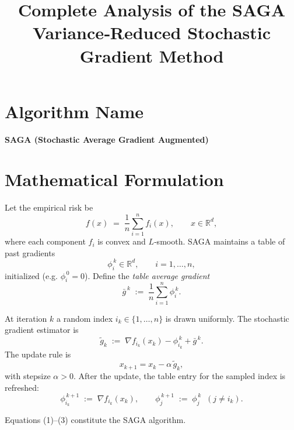 \documentclass[11pt]{article}
\begin{document}
\title{Complete Analysis of the SAGA Variance‑Reduced Stochastic Gradient Method}
\author{}
\date{}
\maketitle

\tableofcontents
\newpage

\section*{Algorithm Name}
\begin{center}
\Large\textbf{SAGA (Stochastic Average Gradient Augmented)}
\end{center}
\section*{Mathematical Formulation}
Let the empirical risk be 
\[
f(x)\;=\;\frac{1}{n}\sum_{i=1}^{n}f_i(x),\qquad x\in\mathbb{R}^d,
\]
where each component $f_i$ is convex and $L$‑smooth.  
SAGA maintains a table of past gradients 
\[
\phi_i^{\,k}\in\mathbb{R}^{d},\qquad i=1,\dots ,n,
\]
initialized (e.g. $\phi_i^{\,0}=0$).  
Define the \emph{table average gradient}
\[
\bar{g}^{\,k}\;:=\;\frac{1}{n}\sum_{i=1}^{n}\phi_i^{\,k}.
\]

At iteration $k$ a random index $i_k\in\{1,\dots ,n\}$ is drawn uniformly.  
The stochastic gradient estimator is
\[
\tilde{g}_k\;:=\;\nabla f_{i_k}(x_k)-\phi_{i_k}^{\,k}+\bar{g}^{\,k}.
\tag{1}
\]
The update rule is
\[
x_{k+1}=x_k-\alpha\,\tilde{g}_k,
\tag{2}
\]
with stepsize $\alpha>0$.  
After the update, the table entry for the sampled index is refreshed:
\[
\phi_{i_k}^{\,k+1}\;:=\;\nabla f_{i_k}(x_k),\qquad 
\phi_{j}^{\,k+1}\;:=\;\phi_{j}^{\,k}\;\;(j\neq i_k).
\tag{3}
\]

Equations (1)–(3) constitute the SAGA algorithm.  

\end{document}
